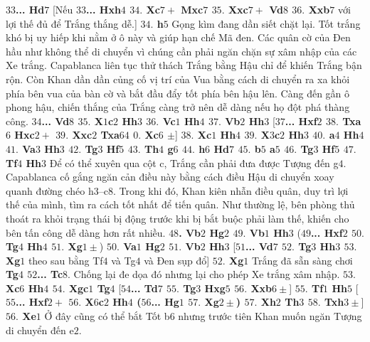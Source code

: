 \begin{multicols}{2}
	\vskip 0.1cm
	\textbf{\color{gocco}$33$... Hd$7$} 
	[Nếu \textbf{\color{gocco}$33$... Hxh$4$ $34.$ Xc$7+$ Mxc$7$ $35.$ Xxc$7+$ Vd$8$ $36.$ Xxb$7$} với lợi thế đủ để Trắng thắng dễ.]
	\vskip 0.1cm
	\textbf{\color{gocco}$34.$ h$5$} Gọng kìm đang dần siết chặt lại. Tốt trắng khó bị uy hiếp khi nằm ở ô này và giúp hạn chế Mã đen. Các quân cờ của Đen hầu như không thể di chuyển vì chúng cần phải ngăn chặn sự xâm nhập của các Xe trắng. Capablanca liên tục thử thách Trắng bằng Hậu chỉ để khiến Trắng bận rộn. Còn Khan dần dần củng cố vị trí của Vua bằng cách di chuyển ra xa khỏi phía bên vua của bàn cờ và bắt đầu đẩy tốt phía bên hậu lên. Càng đến gần ô phong hậu, chiến thắng của Trắng càng trở nên dễ dàng nếu họ đột phá thàng công.
	\vskip 0.1cm
	\textbf{\color{gocco}$34$... Vd$8$ $35.$ X$1$c$2$ Hh$3$ $36.$ Vc$1$ Hh$4$ $37.$ Vb$2$ Hh$3$} 
	\vskip 0.1cm
	[\textbf{\color{gocco}$37$... Hxf$2$ $38.$ Txa$6$ Hxc$2+$ $39.$ Xxc$2$ Txa$64$ $0.$ Xc$6$ $\pm$}]
	\vskip 0.1cm
	\textbf{\color{gocco}$38.$ Xc$1$ Hh$4$ $39.$ X$3$c$2$ Hh$3$ $40.$ a$4$ Hh$4$ $41.$ Va$3$ Hh$3$ $42.$ Tg$3$ Hf$5$ $43.$ Th$4$ g$6$ $44.$ h$6$ Hd$7$ $45.$ b$5$ a$5$ $46.$ Tg$3$ Hf$5$ $47.$ Tf$4$ Hh$3$}
	\vskip 0.1cm
	Để có thể xuyên qua cột c, Trắng cần phải đưa được Tượng đến g$4$. Capablanca cố gắng ngăn cản điều này bằng cách điều Hậu di chuyển xoay quanh đường chéo h$3$--c$8$. Trong khi đó, Khan kiên nhẫn điều quân, duy trì lợi thế của mình, tìm ra cách tốt nhất để tiến quân. Như thường lệ, bên phòng thủ thoát ra khỏi trạng thái bị động trước khi bị bắt buộc phải làm thế, khiến cho bên tấn công dễ dàng hơn rất nhiều. \textbf{\color{gocco}$48$. Vb$2$ Hg$2$ $49.$ Vb$1$ Hh$3$}
	\vskip 0.1cm
	(\textbf{\color{gocco}$49$... Hxf$2$ $50.$ Tg$4$ Hh$4$ $51.$ Xg$1\pm$})
	\vskip 0.1cm
	\textbf{\color{gocco}$50.$ Va$1$ Hg$2$ $51.$ Vb$2$ Hh$3$}
	\vskip 0.1cm 
	[\textbf{\color{gocco}$51$... Vd$7$ $52.$ Tg$3$ Hh$3$ $53.$ Xg$1$} theo sau bằng Tf$4$ và Tg$4$ và Đen sụp đổ]
	\vskip 0.1cm
	\textbf{\color{gocco}$52.$ Xg$1$} Trắng đã sẵn sàng chơi \textbf{\color{gocco}Tg$4$ $52$... Tc$8$}.  Chống lại đe dọa đó nhưng lại cho phép Xe trắng xâm nhập. \textbf{\color{gocco}$53.$ Xc$6$ Hh$4$ $54.$ Xgc$1$ Tg$4$}
	\vskip 0.1cm
	[\textbf{\color{gocco}$54$... Td$7$ $55.$ Tg$3$ Hxg$5$ $56.$ Xxb$6\pm$}]
	\vskip 0.1cm
	\textbf{\color{gocco}$55.$ Tf$1$ Hh$5$}
	\vskip 0.1cm
	[\textbf{\color{gocco}$55$... Hxf$2+$ $56.$ X$6$c$2$ Hh$4$ ($56$... Hg$1$ $57.$ Xg$2\pm$) $57.$ Xh$2$ Th$3$ $58.$ Txh$3\pm$}]
	\vskip 0.1cm
	\textbf{\color{gocco}$56.$ Xe$1$} Ở đây cũng có thể bắt Tốt b$6$ nhưng trước tiên Khan muốn ngăn Tượng di chuyển đến e$2$. 

\end{multicols}
